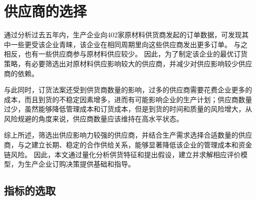 
\section{供应商的选择}

通过分析过去五年内，生产企业向402家原材料供货商发起的订单数据，可发现其中一些更受该企业青睐，该企业在相同周期里向这些供应商发出更多订单。
与之相反，也有一些供应商参与原材料供应较少。
因此，为了制定该企业的最优订货策略，有必要筛选出对原材料供应影响较大的供应商，并减少对供应影响较少供应商的依赖。

与此同时，订货法案还受到供货商数量的影响，过多的供应商需要花费企业更多的成本，而且到货的不稳定因素增多，进而有可能影响企业的生产计划；供应商数量过少，虽然能够降低管理成本和订货成本，但是到货的时间和质量的风险增大，从风险规避的角度来说，供应商数量应该维持在高水平状态\cite{顾丽娟2014基于最优供应商数量的补货策略研究}。

综上所述，筛选出供应影响力较强的供应商，并结合生产需求选择合适数量的供应商，与之建立长期、稳定的合作供给关系，能够显著降低该企业的管理成本和资金链风险。
因此，本文通过量化分析供货特征和提出假设，建立并求解相应评价模型，为生产企业订购决策提供基础和指导。%



\subsection{指标的选取}

